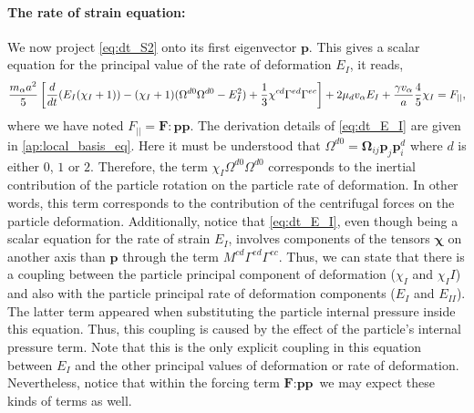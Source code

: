 \paragraph*{The rate of strain equation:}
We now project \ref{eq:dt_S2} onto its first eigenvector $\textbf{p}$.
This gives a scalar equation for the principal value of the rate of deformation $E_I$, it reads, 
\begin{equation}
    \frac{m_\alpha a^2}{5} \left[
        \ddt (E_I (\chi_I+1))
        - (\chi_I+1)( \Omega^{d0} \Omega^{d0}  - E_I^2) 
        + \frac{1}{3} \chi^{cd}
        \Gamma^{ed}\Gamma^{ec}
    \right]
    + 2 \mu_d v_\alpha E_I
    + \frac{\gamma v_\alpha }{a} 
    \frac{4  }{5} \chi_I
    = F_{||},
    \label{eq:dt_E_I}
\end{equation} 
where we have noted $F_{||} = \textbf{F}: \textbf{pp}$.
The derivation details of \ref{eq:dt_E_I} are given in \ref{ap:local_basis_eq}. 
Here it must be understood that $\Omega^{d0}  = \bm\Omega_{ij} \textbf{p}_j \textbf{p}^{d}_i $ where $d$ is either $0$, $1$ or $2$. 
Therefore, the term $\chi_I \Omega^{d0} \Omega^{d0}$ corresponds to the inertial contribution of the particle rotation on the particle rate of deformation. 
In other words, this term corresponds to the contribution of the centrifugal forces on the particle deformation. 
Additionally, notice that \ref{eq:dt_E_I}, even though being a scalar equation for the rate of strain $E_I$, involves components of the tensors $\bm\chi$ on another axis than $\textbf{p}$ through the term $M^{cd}\Gamma^{ed}\Gamma^{ec}$. 
Thus, we can state that there is a coupling between the particle principal component of deformation ($\chi_I$ and $\chi_II$) and also with the particle principal rate of deformation components ($E_I$ and $E_{II}$).
The latter term appeared when substituting the particle internal pressure inside this equation. 
Thus, this coupling is caused by the effect of the particle's internal pressure term. 
Note that this is the only explicit coupling in this equation between $E_I$ and the other principal values of deformation or rate of deformation. 
Nevertheless, notice that within the forcing term $\textbf{F}:\textbf{pp}$ we may expect these kinds of terms as well. 


